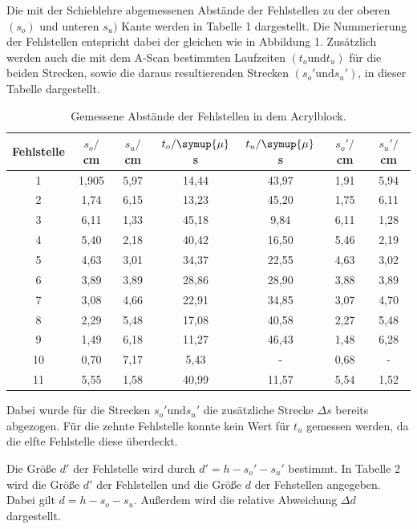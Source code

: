 Die mit der Schieblehre abgemessenen Abstände der Fehlstellen zu der oberen $(s_o)$ und unteren $s_u)$ Kante werden in Tabelle 1 dargestellt. Die Nummerierung der
Fehlstellen entspricht dabei der gleichen wie in Abbildung 1. Zusätzlich werden auch die mit dem A-Scan bestimmten Laufzeiten $(t_o \text{und} t_u)$ für die
 beiden Strecken, sowie die daraus resultierenden Strecken $(s_o' \text{und} s_u')$, in dieser Tabelle dargestellt.
\begin{table}[H]
  \centering
  \caption{Gemessene Abstände der Fehlstellen in dem Acrylblock.}
  \label{tab:spannung1}
  \begin{tabular}{c c c c c c c}
    \toprule
  Fehlstelle & $s_o/$cm & $s_u/$cm & $t_o/\symup{\mu}$s & $t_u/\symup{\mu}$s & $s_o'/$cm & $s_u'/$cm  \\
    \midrule
    1  &  1,905 & 5,97 & 14,44 & 43,97 & 1,91 & 5,94    \\
    2  &  1,74 & 6,15 & 13,23 & 45,20 & 1,75 & 6,11    \\
    3  &  6,11 & 1,33 & 45,18 & 9,84  & 6,11 & 1,28    \\
    4  &  5,40 & 2,18 & 40,42 & 16,50 & 5,46 & 2,19    \\
    5  &  4,63 & 3,01 & 34,37 & 22,55 & 4,63 & 3,02    \\
    6  &  3,89 & 3,89 & 28,86 & 28,90 & 3,88 & 3,89    \\
    7  &  3,08 & 4,66 & 22,91 & 34,85 & 3,07 & 4,70    \\
    8  &  2,29 & 5,48 & 17,08 & 40,58 & 2,27 & 5,48    \\
    9  &  1,49 & 6,18 & 11,27 & 46,43 & 1,48 & 6,28    \\
    10 &  0,70 & 7,17 & 5,43  & -     & 0,68 & -     \\
    11 &  5,55 & 1,58 & 40,99 & 11,57 & 5,54 & 1,52    \\
    \bottomrule
  \end{tabular}
\end{table}

Dabei wurde für die Strecken $s_o' \text{und} s_u'$ die zusätzliche Strecke $\Delta s$ bereits abgezogen. Für die zehnte Fehlstelle konnte
kein Wert für $t_u$ gemessen werden, da die elfte Fehlstelle diese überdeckt.

Die Größe $d'$ der Fehlstelle wird durch $d' = h - s_o' - s_u'$ bestimmt. In Tabelle 2 wird die Größe $d'$ der Fehlstellen und die
Größe $d$ der Fehstellen angegeben. Dabei gilt $d = h - s_o - s_u$. Außerdem wird die relative Abweichung $\Delta d$ dargestellt.


